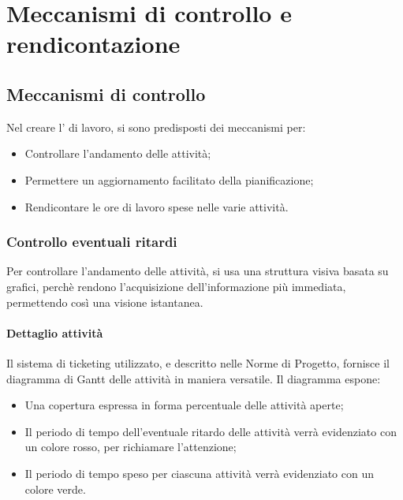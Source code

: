 

\newpage


\newpage


\newpage


\newpage


\newpage


\newpage


\newpage

\section{Meccanismi di controllo e rendicontazione}
\subsection{Meccanismi di controllo}
Nel creare l' di lavoro, si sono predisposti dei meccanismi per:
\begin{itemize}
\item Controllare l'andamento delle attività;
\item Permettere un aggiornamento facilitato della pianificazione;
\item Rendicontare le ore di lavoro spese nelle varie attività.
\end{itemize}
\subsubsection{Controllo eventuali ritardi}
Per controllare l'andamento delle attività, si usa una struttura visiva basata su grafici, perchè rendono l'acquisizione dell'informazione più immediata, permettendo così una visione istantanea.
\paragraph{Dettaglio attività}
Il sistema di ticketing utilizzato, e descritto nelle Norme di Progetto, fornisce il diagramma di Gantt delle attività in maniera versatile. Il diagramma espone:
\begin{itemize}
\item Una copertura espressa in forma percentuale delle attività aperte;
\item Il periodo di tempo dell'eventuale ritardo delle attività verrà evidenziato con un colore rosso, per richiamare l'attenzione;
\item Il periodo di tempo speso per ciascuna attività verrà evidenziato con un colore verde.
\end{itemize}
